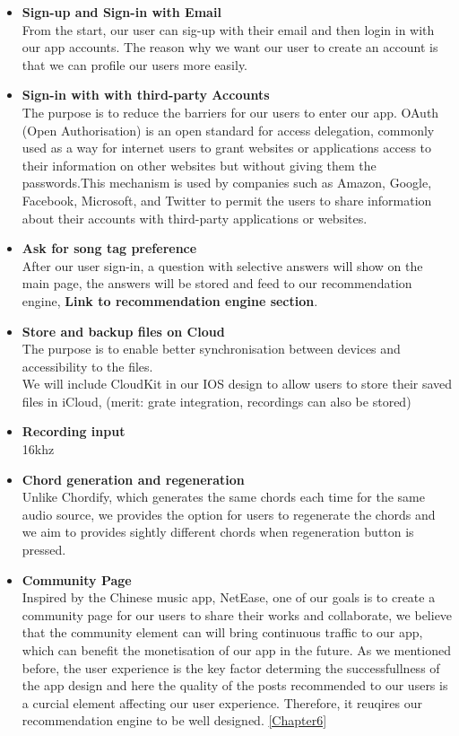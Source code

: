 \begin{itemize}

\item \textbf{Sign-up and Sign-in with Email}
\\From the start, our user can sig-up with their email and then login in with our app accounts. The reason why we want our user to create an account is that we can profile our users more easily.

\item \textbf{Sign-in with with third-party Accounts}
\\ The purpose is to reduce the barriers for our users to enter our app. OAuth (Open Authorisation) is an open standard for access delegation, commonly used as a way for internet users to grant websites or applications access to their information on other websites but without giving them the passwords.This mechanism is used by companies such as Amazon, Google, Facebook, Microsoft, and Twitter to permit the users to share information about their accounts with third-party applications or websites.

\item \textbf{Ask for song tag preference}
\\After our user sign-in, a question with selective answers will show on the main page, the answers will be stored and feed to our recommendation engine, \textbf{Link to recommendation engine section}.

\item \textbf{Store and backup files on Cloud}
\\The purpose is to enable better synchronisation between devices and accessibility to the files. 
\\We will include CloudKit in our IOS design to allow users to store their saved files in iCloud, (merit: grate integration, recordings can also be stored)

\item \textbf{Recording input}
\\ 16khz

\item \textbf{Chord generation and regeneration}
\\Unlike Chordify, which generates the same chords each time for the same audio source, we provides the option for users to regenerate the chords and we aim to provides sightly different chords when regeneration button is pressed.

\item \textbf{Community Page}
\\Inspired by the Chinese music app, NetEase, one of our goals is to create a community page for our users to share their works and collaborate, 
we believe that the community element can will bring continuous traffic to our app, which can benefit the monetisation of our app in the future.
As we mentioned before, the user experience is the key factor determing the successfullness of the app design and here the quality of the posts recommended to our users is a curcial element affecting our user experience. 
Therefore, it reuqires our recommendation engine to be well designed. \autoref{Chapter6}


\end{itemize}
